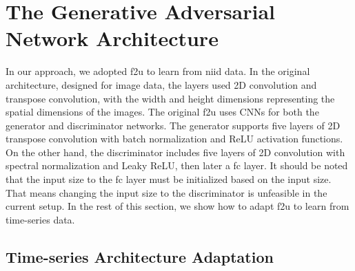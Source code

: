 \section{The Generative Adversarial Network Architecture}

In our approach, we adopted \gls*{f2u} to learn from \gls*{niid} data. In the original architecture, designed for image data, the layers used 2D convolution and transpose convolution, with the width and height dimensions representing the spatial dimensions of the images. 
%
The original \gls*{f2u} uses CNNs for both the generator and discriminator networks. The generator supports five layers of 2D transpose convolution with batch normalization and ReLU activation functions. On the other hand, the discriminator includes five layers of 2D convolution with spectral normalization \cite{miyato_spectral_2018} and Leaky ReLU, then later a \gls*{fc} layer. It should be noted that the input size to the \gls*{fc} layer must be initialized based on the input size. That means changing the input size to the discriminator is unfeasible in the current setup.
In the rest of this section, we show how to adapt \gls*{f2u} to learn from time-series data.


\subsection{Time-series Architecture Adaptation}

